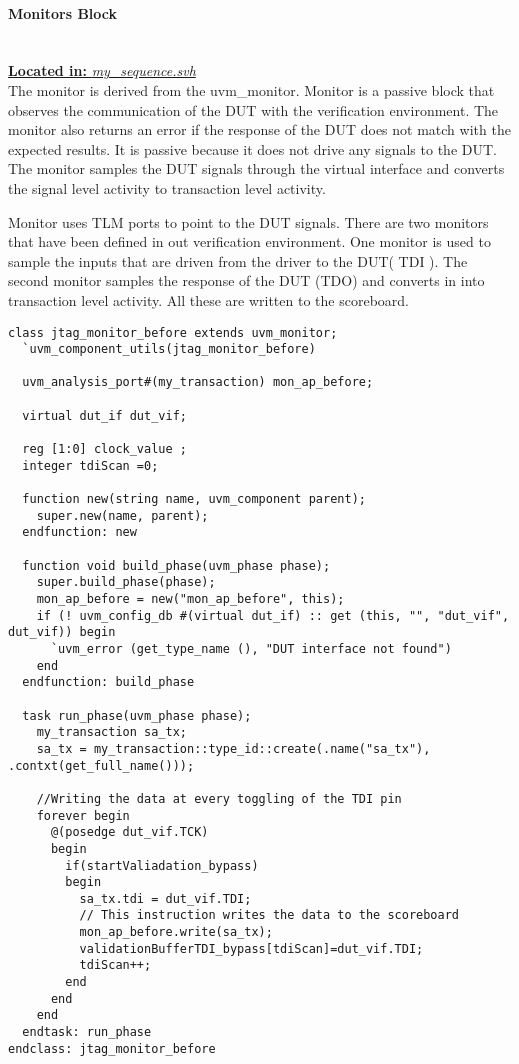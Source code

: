 \documentclass[a4paper,11pt]{article}
\begin{document}
\FloatBarrier
\paragraph{Monitors Block}\mbox{}\\
\underline{\textbf{Located in:} \textit{my\_sequence.svh}}\\
The monitor is derived from the uvm\_monitor. Monitor is a passive block that observes the communication of the DUT with the verification environment. The monitor also returns an error if the response of the DUT does not match with the expected results. It is passive because it does not drive any signals to the DUT. The monitor samples the DUT signals through the virtual interface and converts the signal level activity to transaction level activity.

Monitor uses TLM ports to point to the DUT signals. There are two monitors that have been defined in out verification environment. One monitor is used to sample the inputs that are driven from the driver to the DUT( TDI ). The second monitor samples the response of the DUT (TDO) and converts in into transaction level activity. All these are written to the scoreboard.

\begin{lstlisting}[style={verilog-style}, backgroundcolor=\color{lightgray}]
class jtag_monitor_before extends uvm_monitor;
  `uvm_component_utils(jtag_monitor_before)

  uvm_analysis_port#(my_transaction) mon_ap_before;
 
  virtual dut_if dut_vif;
	
  reg [1:0] clock_value ;
  integer tdiScan =0;

  function new(string name, uvm_component parent);
    super.new(name, parent);
  endfunction: new
 
  function void build_phase(uvm_phase phase);
    super.build_phase(phase);
    mon_ap_before = new("mon_ap_before", this);		  
    if (! uvm_config_db #(virtual dut_if) :: get (this, "", "dut_vif", dut_vif)) begin
      `uvm_error (get_type_name (), "DUT interface not found")
    end         
  endfunction: build_phase

  task run_phase(uvm_phase phase);
    my_transaction sa_tx;
    sa_tx = my_transaction::type_id::create(.name("sa_tx"), .contxt(get_full_name()));

    //Writing the data at every toggling of the TDI pin
    forever begin
      @(posedge dut_vif.TCK)
      begin
        if(startValiadation_bypass)
        begin
          sa_tx.tdi = dut_vif.TDI;
          // This instruction writes the data to the scoreboard
          mon_ap_before.write(sa_tx); 
          validationBufferTDI_bypass[tdiScan]=dut_vif.TDI; 
          tdiScan++;
        end
      end			
    end
  endtask: run_phase
endclass: jtag_monitor_before
\end{lstlisting}
\end{document}
